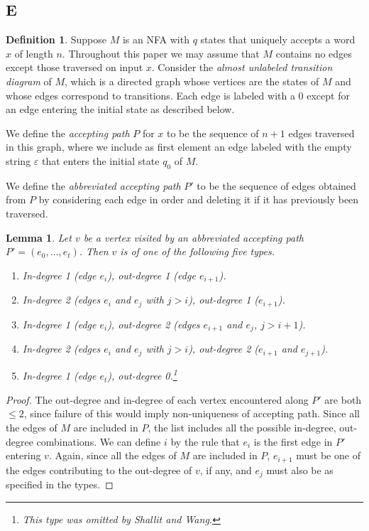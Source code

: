 \documentclass[12pt]{article}
\newcommand{\eps}{\varepsilon}
\theoremstyle{plain}
\newtheorem{lem}[thm]{Lemma}
\theoremstyle{definition}
\newtheorem{df}[thm]{Definition}
\theoremstyle{remark}
\begin{document}
		\subsection{E}
			\begin{df}
				Suppose $M$ is an NFA with $q$ states that uniquely accepts a word $x$ of length $n$.
				Throughout this paper we may assume that $M$ contains no edges except those
				traversed on input $x$.
				Consider the \emph{almost unlabeled transition diagram} of $M$, which is
				a directed graph whose vertices are the states of $M$
				and whose edges correspond to transitions.
				Each edge is labeled with a 0 except for an edge entering the initial state as described below.

				We define the \emph{accepting path} $P$ for $x$ to be the sequence of $n+1$ edges traversed in this graph,
				where we include as first element an edge labeled with the empty string $\eps$ that enters the initial state $q_0$ of $M$.

				We define the \emph{abbreviated accepting path} $P'$ to be the sequence of edges obtained from $P$ by considering each edge
				in order and deleting it if it has previously been traversed.
			\end{df}
			\begin{lem}\label{types}
				Let $v$ be a vertex visited by an abbreviated accepting path $P'=(e_0, \ldots, e_t)$.
				Then $v$ is of one of the following five types.
				\begin{enumerate}
					\item In-degree 1 (edge $e_i$), out-degree 1 (edge $e_{i+1}$).
					\item In-degree 2 (edges $e_i$ and $e_j$ with $j>i$), out-degree 1 ($e_{i+1}$).
					\item In-degree 1 (edge $e_i$), out-degree 2 (edges $e_{i+1}$ and $e_j$, $j>i+1$).
					\item In-degree 2 (edges $e_i$ and $e_j$ with $j>i$), out-degree 2 ($e_{i+1}$ and $e_{j+1}$).
					\item In-degree 1 (edge $e_t$), out-degree 0.\footnote{This type was omitted by Shallit and Wang.}
				\end{enumerate}
			\end{lem}
			\begin{proof}
				The out-degree and in-degree of each vertex encountered along $P'$ are both $\le 2$,
				since failure of this would imply non-uniqueness of accepting path.
				Since all the edges of $M$ are included in $P$, the list includes all the possible in-degree, out-degree combinations.
				We can define $i$ by the rule that $e_i$ is the first edge in $P'$ entering $v$.
				Again, since all the edges of $M$ are included in $P$,
				$e_{i+1}$ must be one of the edges contributing to the out-degree of $v$, if any,
				and $e_j$ must also be as specified in the types.
			\end{proof}
\end{document}
